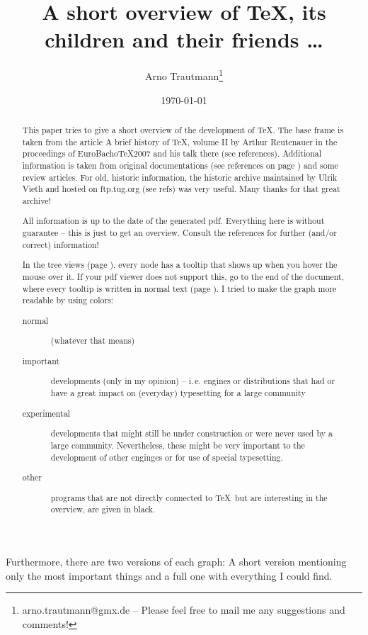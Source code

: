\documentclass{scrartcl}
\title{A short overview of \TeX, its children and their friends \dots}
\author{Arno Trautmann\thanks{arno.trautmann@gmx.de – Please feel free to mail me any suggestions and comments!}}
\date{\today}
\begin{document}
\maketitle

\begin{abstract}
This paper tries to give a short overview of the development of \TeX. The base frame is taken from the article \textsf{A brief history of \TeX, volume II} by Arthur Reutenauer in the proceedings of \textsf{EuroBacho\TeX 2007} and his talk there (see references). Additional information is taken from original documentations (see references on page \pageref{sec:refs}) and some review articles. For old, historic information, the \textsf{historic archive} maintained by Ulrik Vieth and hosted on ftp.tug.org (see refs) was very useful. Many thanks for that great archive!

All information is up to the date of the generated pdf. Everything here is without guarantee – this is just to get an overview. Consult the references for further (and/or correct) information! 

In the tree views (page \pageref{sec:tree}), every node has a tooltip that shows up when you hover the mouse over it. If your pdf viewer does not support this, go to the end of the document, where every tooltip is written in normal text (page \pageref{sec:text}). I tried to make the graph more readable by using colors:

\begin{description}
\item[{\color[rgb]{\normalimportant} normal}] (whatever that means)
\item[{\color[rgb]{\vip} important}] developments (only in my opinion) – i.\,e. engines or distributions that had or have a great impact on (everyday) typesetting for a large community
\item[{\color[rgb]{\experimental} experimental}] developments that might still be under construction or were never used by a large community. Nevertheless, these might be very important to the development of other enginges or for use of special typesetting. \item[{\color[rgb]{\other} other}] programs that are not directly connected to \TeX\ but are interesting in the overview, are given in black.
\end{description}
\end{abstract}

Furthermore, there are two versions of each graph: A short version mentioning only the most important things and a full one with everything I could find.
\end{document}

